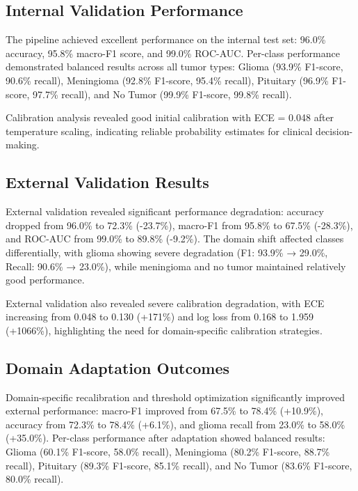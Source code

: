 \documentclass[11pt,a4paper]{article}
\begin{document}
\subsection{Internal Validation Performance}

The pipeline achieved excellent performance on the internal test set: 96.0\% accuracy, 95.8\% macro-F1 score, and 99.0\% ROC-AUC. Per-class performance demonstrated balanced results across all tumor types: Glioma (93.9\% F1-score, 90.6\% recall), Meningioma (92.8\% F1-score, 95.4\% recall), Pituitary (96.9\% F1-score, 97.7\% recall), and No Tumor (99.9\% F1-score, 99.8\% recall).

Calibration analysis revealed good initial calibration with ECE = 0.048 after temperature scaling, indicating reliable probability estimates for clinical decision-making.

\subsection{External Validation Results}

External validation revealed significant performance degradation: accuracy dropped from 96.0\% to 72.3\% (-23.7\%), macro-F1 from 95.8\% to 67.5\% (-28.3\%), and ROC-AUC from 99.0\% to 89.8\% (-9.2\%). The domain shift affected classes differentially, with glioma showing severe degradation (F1: 93.9\% → 29.0\%, Recall: 90.6\% → 23.0\%), while meningioma and no tumor maintained relatively good performance.

External validation also revealed severe calibration degradation, with ECE increasing from 0.048 to 0.130 (+171\%) and log loss from 0.168 to 1.959 (+1066\%), highlighting the need for domain-specific calibration strategies.

\subsection{Domain Adaptation Outcomes}

Domain-specific recalibration and threshold optimization significantly improved external performance: macro-F1 improved from 67.5\% to 78.4\% (+10.9\%), accuracy from 72.3\% to 78.4\% (+6.1\%), and glioma recall from 23.0\% to 58.0\% (+35.0\%). Per-class performance after adaptation showed balanced results: Glioma (60.1\% F1-score, 58.0\% recall), Meningioma (80.2\% F1-score, 88.7\% recall), Pituitary (89.3\% F1-score, 85.1\% recall), and No Tumor (83.6\% F1-score, 80.0\% recall).
\end{document}
